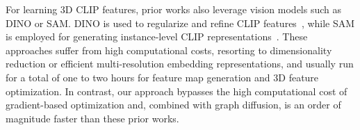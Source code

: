 For learning 3D CLIP features, prior works also leverage vision models such as DINO or SAM. DINO is used to regularize and refine CLIP features~\citep{kerr2023lerf, liu2023weakly, zuo2024fmgs, shi2024legaussians}, while SAM is employed for generating instance-level CLIP representations~\citep{qin2023langsplat, wu2024opengaussian, jun2025drsplat}. These approaches suffer from high computational costs, resorting to dimensionality reduction or efficient multi-resolution embedding representations, and usually run for a total of one to two hours for feature map generation and 3D feature optimization. 
In contrast, our approach bypasses the high computational cost of gradient-based optimization and, combined with graph diffusion, is an order of magnitude faster than these prior works.